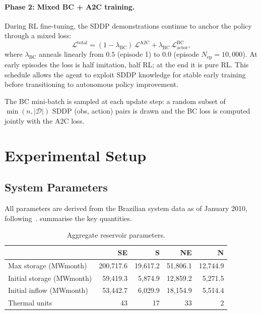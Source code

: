 \documentclass[11pt,letterpaper]{article}
\begin{document}
\paragraph{Phase 2: Mixed BC + A2C training.}
During RL fine-tuning, the SDDP demonstrations continue to anchor the policy
through a mixed loss:
\begin{equation}
  \mathcal{L}^{\mathrm{total}} =
  (1 - \lambda_{\mathrm{BC}})\,\mathcal{L}^{\mathrm{A2C}}
  + \lambda_{\mathrm{BC}}\,\mathcal{L}^{\mathrm{BC}}_{\mathrm{actor}},
  \label{eq:mixed}
\end{equation}
where $\lambda_{\mathrm{BC}}$ anneals linearly from $0.5$ (episode 1) to $0.0$
(episode $N_{\mathrm{ep}} = 10{,}000$).
At early episodes the loss is half imitation, half RL; at the end it is pure RL.
This schedule allows the agent to exploit SDDP knowledge for stable early
training before transitioning to autonomous policy improvement.

The BC mini-batch is sampled at each update step: a random subset of
$\min(n, |\mathcal{D}|)$ SDDP (obs, action) pairs is drawn and the BC loss
is computed jointly with the A2C loss.

\section{Experimental Setup}
\label{sec:experiments}

\subsection{System Parameters}

All parameters are derived from the Brazilian system data as of January 2010,
following~\citet{shapiro2011,shapiro2013}.
 summarise the key quantities.

\begin{table}[H]
  \centering
  \caption{Aggregate reservoir parameters.}
  \label{tab:system}
  \begin{tabular}{lrrrr}
    \toprule
    & SE & S & NE & N \\
    \midrule
    Max storage (MWmonth)     & 200{,}717.6 & 19{,}617.2 & 51{,}806.1 & 12{,}744.9 \\
    Initial storage (MWmonth) &  59{,}419.3 &  5{,}874.9 & 12{,}859.2 &  5{,}271.5 \\
    Initial inflow (MWmonth)  &  53{,}442.7 &  6{,}029.9 & 18{,}154.9 &  5{,}514.4 \\
    Thermal units             &          43 &         17 &         33 &          2 \\
    \bottomrule
  \end{tabular}
\end{table}
\end{document}
